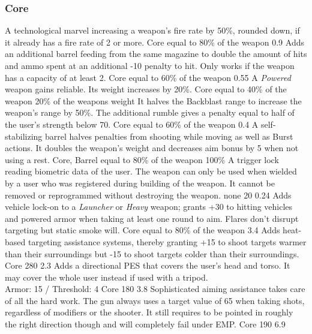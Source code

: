 \subsubsection{Core}
\vspace{8mm}
\begin{multicols}{2}
    {A technological marvel increasing a weapon's fire rate by 50\%,
        rounded down, if it already has a fire rate of 2 or more.}
    {Core}
    {equal to 80\% of the weapon}
    {0.9}
    {Adds an additional barrel feeding from the same magazine
        to double the amount of hits and ammo spent at an additional -10 penalty to hit.
        Only works if the weapon has a capacity of at least 2.}
    {Core}
    {equal to 60\% of the weapon}
    {0.55}
    {A \emph{Powered} weapon gains reliable.
        Its weight increases by 20\%.}
    {Core}
    {equal to 40\% of the weapon}
    {20\% of the weapons weight} %
    {It halves the Backblast range to increase the weapon's range by 50\%.
        The additional rumble gives a penalty equal to half of the user's strength below 70.}
    {Core}
    {equal to 60\% of the weapon}
    {0.4}
    {A self-stabilizing barrel halves penalties from shooting while moving as well as Burst actions.
        It doubles the weapon's weight and decreases aim bonus by 5 when not using a rest.}
    {Core, Barrel}
    {equal to 80\% of the weapon}
    {100\%} %
    {A trigger lock reading biometric data of the user.
        The weapon can only be used when wielded by a user
        who was registered during building of the weapon.
        It cannot be removed or reprogrammed without destroying the weapon.}
    {none}
    {20}
    {0.24}
    {Adds vehicle lock-on to a \emph{Launcher} or \emph{Heavy} weapon;
        grants +30 to hitting vehicles and powered armor
        when taking at least one round to aim.
        Flares don't disrupt targeting but static smoke will.}
    {Core}
    {equal to 80\% of the weapon}
    {3.4}
    {Adds heat-based targeting assistance systems,
        thereby granting +15 to shoot targets warmer than their surroundings
        but -15 to shoot targets colder than their surroundings.}
    {Core}
    {280}
    {2.3}
    {Adds a directional PES that covers the user's head and torso.
	It may cover the whole user instead if used with a tripod.\\
	Armor: 15 / Threshold: 4}
    {Core}
    {180}
    {3.8}
    {Sophisticated aiming assistance takes care of all the hard work.
        The gun always uses a target value of 65 when taking shots,
        regardless of modifiers or the shooter.
        It still requires to be pointed in roughly the right direction though
        and will completely fail under EMP.}
     {Core}
     {190}
     {6.9}
\end{multicols}

